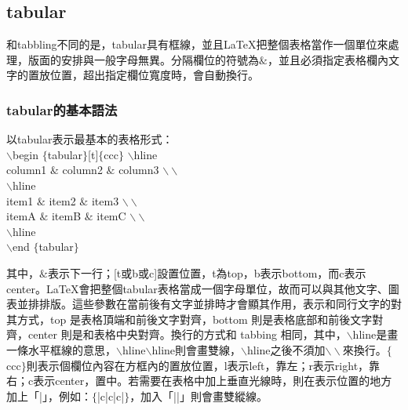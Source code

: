 \subsection{\BM tabular}
	和tabbling不同的是，tabular具有框線，並且\LaTeX 把整個表格當作一個單位來處理，版面的安排與一般字母無異。分隔欄位的符號為$\&$，並且必須指定表格欄內文字的置放位置，超出指定欄位寬度時，會自動換行。

\subsubsection{\BM tabular的基本語法}
\noindent 以tabular表示最基本的表格形式： \\
$\backslash$begin $\{$tabular$\}$[t]$\{$ccc$\}$
$\backslash$hline \\
column1 \;$\&$ \;column2 \;$\&$ \;column3 \;$\backslash\backslash$  \\
$\backslash$hline \\
item1 \;$\&$ \;item2 \;$\&$ \;item3 \;$\backslash\backslash$\\
itemA \;$\&$ \;itemB \;$\&$ \;itemC \;$\backslash\backslash$\\
$\backslash$hline \\
$\backslash$end $\{$tabular$\}$

	\indent 其中，$\&$表示下一行；[t或b或c]設置位置，t為top，b表示bottom，而c表示center。\LaTeX 會把整個tabular表格當成一個字母單位，故而可以與其他文字、圖表並排排版。這些參數在當前後有文字並排時才會顯其作用，表示和同行文字的對其方式，top 是表格頂端和前後文字對齊，bottom 則是表格底部和前後文字對齊，center 則是和表格中央對齊。換行的方式和 tabbing 相同，其中，$\backslash$hline是畫一條水平框線的意思，$\backslash$hline$\backslash$hline則會畫雙線，$\backslash$hline之後不須加$\backslash\backslash$來換行。$\{$ccc$\}$則表示個欄位內容在方框內的置放位置，l表示left，靠左；r表示right，靠右；c表示center，置中。若需要在表格中加上垂直光線時，則在表示位置的地方加上「|」，例如：$\{$|c|c|c|$\}$，加入「||」則會畫雙縱線。


